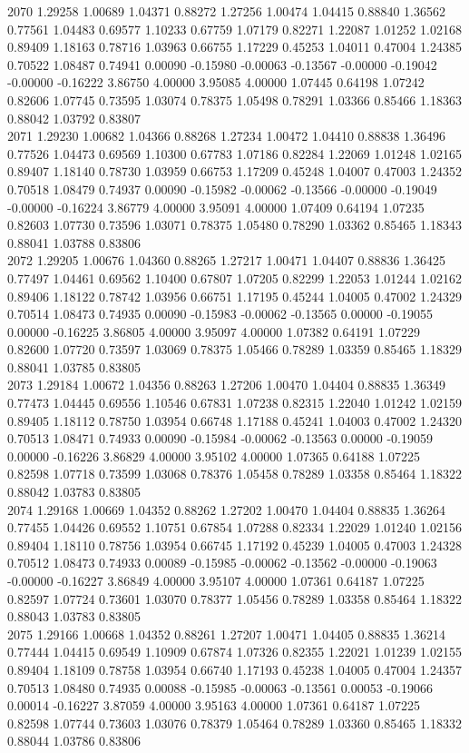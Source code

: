 {2070 1.29258 1.00689 1.04371 0.88272 1.27256 1.00474 1.04415 0.88840 1.36562 0.77561 1.04483 0.69577 1.10233 0.67759 1.07179 0.82271 1.22087 1.01252 1.02168 0.89409 1.18163 0.78716 1.03963 0.66755 1.17229 0.45253 1.04011 0.47004 1.24385 0.70522 1.08487 0.74941 0.00090 -0.15980 -0.00063 -0.13567 -0.00000 -0.19042 -0.00000 -0.16222 3.86750 4.00000 3.95085 4.00000 1.07445 0.64198 1.07242 0.82606 1.07745 0.73595 1.03074 0.78375 1.05498 0.78291 1.03366 0.85466 1.18363 0.88042 1.03792 0.83807 \\
2071 1.29230 1.00682 1.04366 0.88268 1.27234 1.00472 1.04410 0.88838 1.36496 0.77526 1.04473 0.69569 1.10300 0.67783 1.07186 0.82284 1.22069 1.01248 1.02165 0.89407 1.18140 0.78730 1.03959 0.66753 1.17209 0.45248 1.04007 0.47003 1.24352 0.70518 1.08479 0.74937 0.00090 -0.15982 -0.00062 -0.13566 -0.00000 -0.19049 -0.00000 -0.16224 3.86779 4.00000 3.95091 4.00000 1.07409 0.64194 1.07235 0.82603 1.07730 0.73596 1.03071 0.78375 1.05480 0.78290 1.03362 0.85465 1.18343 0.88041 1.03788 0.83806 \\
2072 1.29205 1.00676 1.04360 0.88265 1.27217 1.00471 1.04407 0.88836 1.36425 0.77497 1.04461 0.69562 1.10400 0.67807 1.07205 0.82299 1.22053 1.01244 1.02162 0.89406 1.18122 0.78742 1.03956 0.66751 1.17195 0.45244 1.04005 0.47002 1.24329 0.70514 1.08473 0.74935 0.00090 -0.15983 -0.00062 -0.13565 0.00000 -0.19055 0.00000 -0.16225 3.86805 4.00000 3.95097 4.00000 1.07382 0.64191 1.07229 0.82600 1.07720 0.73597 1.03069 0.78375 1.05466 0.78289 1.03359 0.85465 1.18329 0.88041 1.03785 0.83805 \\
2073 1.29184 1.00672 1.04356 0.88263 1.27206 1.00470 1.04404 0.88835 1.36349 0.77473 1.04445 0.69556 1.10546 0.67831 1.07238 0.82315 1.22040 1.01242 1.02159 0.89405 1.18112 0.78750 1.03954 0.66748 1.17188 0.45241 1.04003 0.47002 1.24320 0.70513 1.08471 0.74933 0.00090 -0.15984 -0.00062 -0.13563 0.00000 -0.19059 0.00000 -0.16226 3.86829 4.00000 3.95102 4.00000 1.07365 0.64188 1.07225 0.82598 1.07718 0.73599 1.03068 0.78376 1.05458 0.78289 1.03358 0.85464 1.18322 0.88042 1.03783 0.83805 \\
2074 1.29168 1.00669 1.04352 0.88262 1.27202 1.00470 1.04404 0.88835 1.36264 0.77455 1.04426 0.69552 1.10751 0.67854 1.07288 0.82334 1.22029 1.01240 1.02156 0.89404 1.18110 0.78756 1.03954 0.66745 1.17192 0.45239 1.04005 0.47003 1.24328 0.70512 1.08473 0.74933 0.00089 -0.15985 -0.00062 -0.13562 -0.00000 -0.19063 -0.00000 -0.16227 3.86849 4.00000 3.95107 4.00000 1.07361 0.64187 1.07225 0.82597 1.07724 0.73601 1.03070 0.78377 1.05456 0.78289 1.03358 0.85464 1.18322 0.88043 1.03783 0.83805 \\
2075 1.29166 1.00668 1.04352 0.88261 1.27207 1.00471 1.04405 0.88835 1.36214 0.77444 1.04415 0.69549 1.10909 0.67874 1.07326 0.82355 1.22021 1.01239 1.02155 0.89404 1.18109 0.78758 1.03954 0.66740 1.17193 0.45238 1.04005 0.47004 1.24357 0.70513 1.08480 0.74935 0.00088 -0.15985 -0.00063 -0.13561 0.00053 -0.19066 0.00014 -0.16227 3.87059 4.00000 3.95163 4.00000 1.07361 0.64187 1.07225 0.82598 1.07744 0.73603 1.03076 0.78379 1.05464 0.78289 1.03360 0.85465 1.18332 0.88044 1.03786 0.83806 \\
}\fcfdata
